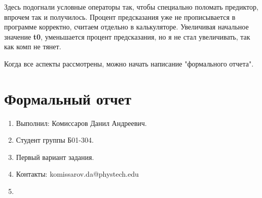 Здесь подогнали условные операторы так, чтобы специально поломать предиктор, впрочем так и получилось. Процент предсказания уже не прописывается в программе корректно, считаем отдельно в калькуляторе. Увеличивая начальное значение \textbf{t0}, уменьшается процент предсказания, но я не стал увеличивать, так как комп не тянет.

Когда все аспекты рассмотрены, можно начать написание "формального отчета".

\section{Формальный отчет}
\begin{enumerate}
    \item Выполнил: Комиссаров Данил Андреевич.
    \item Студент группы Б01-304.
    \item Первый вариант задания.
    \item Контакты: komissarov.da@phystech.edu
    \item
\end{enumerate}
